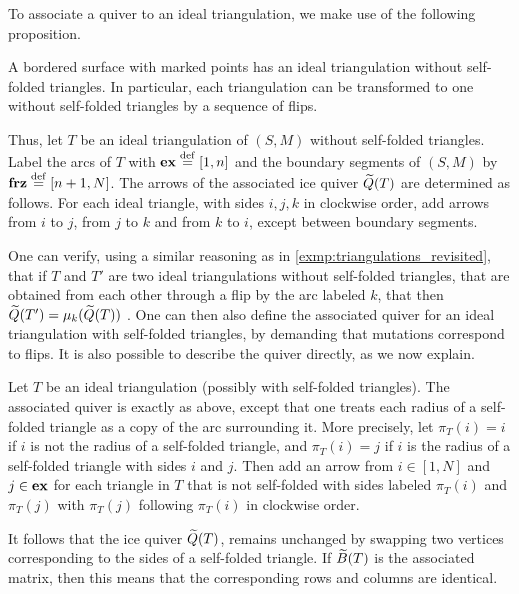 To associate a quiver to an ideal triangulation, we make use of the following
proposition.

\begin{proposition}

	A bordered surface with marked points has an ideal triangulation without self-folded
	triangles. In particular, each triangulation can be transformed to one without
	self-folded triangles by a sequence of flips.
\end{proposition}

Thus, let $T$ be an ideal triangulation of $(S, M)$ without self-folded triangles.
Label the arcs of $T$ with $\mathbf{ex} \overset{\mathrm{def}}{=} [1,n]$ and the boundary segments of $(S, M)$ by
$\mathbf{frz} \overset{\mathrm{def}}{=} [n+1, N]$. The arrows of the associated ice quiver $\widetilde{Q}(T)$ are determined
as follows. For each ideal triangle, with sides $i,j,k$ in clockwise order, add arrows
from $i$ to $j$, from $j$ to $k$ and from $k$ to $i$, except between boundary segments.

One can verify, using a similar reasoning as in \cref{exmp:triangulations_revisited},
that if $T$ and $T'$ are two ideal triangulations without self-folded triangles, that
are obtained from each other through a flip by the arc labeled $k$, that then $\widetilde{Q}(T')
	= \mu_k(\widetilde{Q}(T))$ \parencite[Proposition 4.8]{FominShapiroThurston2008CATriangulatedSurfacesI}. One can then
also define the associated quiver for an ideal triangulation with self-folded
triangles, by demanding that mutations correspond to flips. It is also possible to
describe the quiver directly, as we now explain.

Let $T$ be an ideal triangulation (possibly with self-folded triangles). The associated
quiver is exactly as above, except that one treats each radius of a self-folded
triangle as a copy of the arc surrounding it. More precisely, let $\pi_T(i) = i$ if $i$
is not the radius of a self-folded triangle, and $\pi_T(i) = j$ if $i$ is the radius of
a self-folded triangle with sides $i$ and $j$. Then add an arrow from $i \in [1, N]$
and $j \in \mathbf{ex}$ for each triangle in $T$ that is not self-folded with sides labeled
$\pi_T(i)$ and $\pi_T(j)$ with $\pi_T(j)$ following $\pi_T(i)$ in clockwise order.

It follows that the ice quiver $\widetilde{Q}(T)$, remains unchanged by swapping two vertices
corresponding to the sides of a self-folded triangle. If $\widetilde{B}(T)$ is the associated
matrix, then this means that the corresponding rows and columns are identical.


